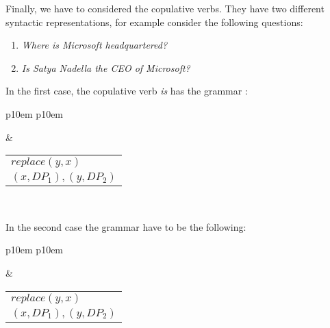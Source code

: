 Finally, we have to considered the copulative verbs. They have two different syntactic representations, for example consider the following questions:
\begin{enumerate}
\item \textit{Where is Microsoft headquartered?}
\item \textit{Is Satya Nadella the CEO of Microsoft?}
\end{enumerate}
In the first case, the copulative verb \textit{is} has the grammar :
\medskip
\begin{center}
\begin{tabular}{ p{10em} p{10em} }
	\label{tbl:grammar.is}
	
	\begin{center}
		\begin{tikzpicture}
		\Tree [.S [.DP$_1\downarrow$ ] [.VP [.V is ] DP$_2\downarrow$ ] ]	
		\end{tikzpicture}
	\end{center}
	
	&

	\begin{center}
		\begin{tabular}{|c|l|}
			\hline
			\mbox{} & \mbox{}\\
			\hline
			\multicolumn{2}{|l|}{
				$replace(y,x)$
			} \\
			\hline
			\multicolumn{2}{|l|}{
				$(x,DP_{1}),(y,DP_{2})$
			} \\
			\hline
		\end{tabular}
	\end{center}	
	\\
\end{tabular}
\end{center}
\medskip

In the second case the grammar have to be the following:
\medskip
\begin{center}
\begin{tabular}{ p{10em} p{10em} }
	\label{tbl:grammar.is}
	
	\begin{center}
		\begin{tikzpicture}
		\Tree [.S [.VP [.V is ] DP$_1\downarrow$ ] [.DP$_2\downarrow$ ] ]	
		\end{tikzpicture}
	\end{center}
	
	&

	\begin{center}
		\begin{tabular}{|c|l|}
			\hline
			\mbox{} & \mbox{}\\
			\hline
			\multicolumn{2}{|l|}{
				$replace(y,x)$
			} \\
			\hline
			\multicolumn{2}{|l|}{
				$(x,DP_{1}),(y,DP_{2})$
			} \\
			\hline
		\end{tabular}
	\end{center}	
	\\
\end{tabular}
\end{center}
\medskip